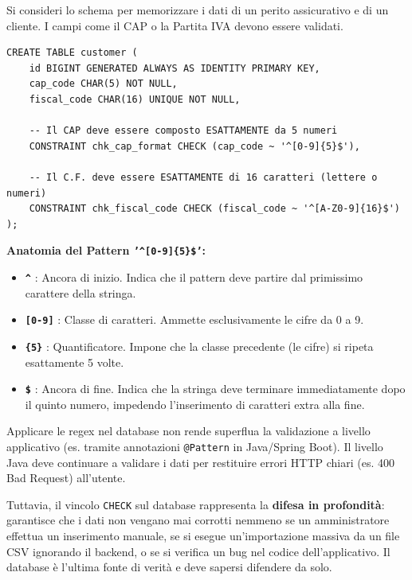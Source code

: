 \begin{example}
Si consideri lo schema per memorizzare i dati di un perito assicurativo e di un cliente. I campi come il CAP o la Partita IVA devono essere validati.
\begin{lstlisting}[language=PostgreSQL, basicstyle=\ttfamily\small, keywordstyle=\color{blue}\bfseries]
CREATE TABLE customer (
    id BIGINT GENERATED ALWAYS AS IDENTITY PRIMARY KEY,
    cap_code CHAR(5) NOT NULL,
    fiscal_code CHAR(16) UNIQUE NOT NULL,
    
    -- Il CAP deve essere composto ESATTAMENTE da 5 numeri
    CONSTRAINT chk_cap_format CHECK (cap_code ~ '^[0-9]{5}$'),
    
    -- Il C.F. deve essere ESATTAMENTE di 16 caratteri (lettere o numeri)
    CONSTRAINT chk_fiscal_code CHECK (fiscal_code ~ '^[A-Z0-9]{16}$')
);
\end{lstlisting}

\textbf{Anatomia del Pattern \texttt{'\textasciicircum[0-9]\{5\}\$'}:}
\begin{itemize}
    \item \textbf{\texttt{\textasciicircum}} : Ancora di inizio. Indica che il pattern deve partire dal primissimo carattere della stringa.
    \item \textbf{\texttt{[0-9]}} : Classe di caratteri. Ammette esclusivamente le cifre da 0 a 9.
    \item \textbf{\texttt{\{5\}}} : Quantificatore. Impone che la classe precedente (le cifre) si ripeta esattamente 5 volte.
    \item \textbf{\texttt{\$}} : Ancora di fine. Indica che la stringa deve terminare immediatamente dopo il quinto numero, impedendo l'inserimento di caratteri extra alla fine.
\end{itemize}
\end{example}

\begin{observation}
Applicare le regex nel database non rende superflua la validazione a livello applicativo (es. tramite annotazioni \texttt{@Pattern} in Java/Spring Boot). Il livello Java deve continuare a validare i dati per restituire errori HTTP chiari (es. 400 Bad Request) all'utente. 

Tuttavia, il vincolo \texttt{CHECK} sul database rappresenta la \textbf{difesa in profondità}: garantisce che i dati non vengano mai corrotti nemmeno se un amministratore effettua un inserimento manuale, se si esegue un'importazione massiva da un file CSV ignorando il backend, o se si verifica un bug nel codice dell'applicativo. Il database è l'ultima fonte di verità e deve sapersi difendere da solo.
\end{observation}

